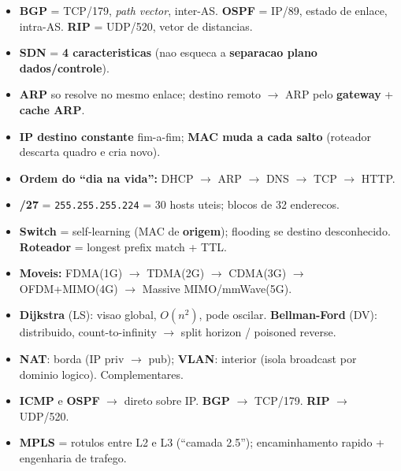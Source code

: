 \documentclass[11pt,a4paper]{article}
\begin{document}
\begin{colafinal}
\begin{itemize}[noitemsep, leftmargin=1.5em]
    \item \textbf{BGP} = TCP/179, \textit{path vector}, inter-AS. \quad \textbf{OSPF} = IP/89, estado de enlace, intra-AS. \quad \textbf{RIP} = UDP/520, vetor de distancias.
    \item \textbf{SDN} = \textbf{4 caracteristicas} (nao esqueca a \textbf{separacao plano dados/controle}).
    \item \textbf{ARP} so resolve no mesmo enlace; destino remoto $\to$ ARP pelo \textbf{gateway} + \textbf{cache ARP}.
    \item \textbf{IP destino constante} fim-a-fim; \textbf{MAC muda a cada salto} (roteador descarta quadro e cria novo).
    \item \textbf{Ordem do ``dia na vida'':} DHCP $\to$ ARP $\to$ DNS $\to$ TCP $\to$ HTTP.
    \item \textbf{/27} = \texttt{255.255.255.224} = 30 hosts uteis; blocos de 32 enderecos.
    \item \textbf{Switch} = self-learning (MAC de \textbf{origem}); flooding se destino desconhecido. \quad \textbf{Roteador} = longest prefix match + TTL.
    \item \textbf{Moveis:} FDMA(1G) $\to$ TDMA(2G) $\to$ CDMA(3G) $\to$ OFDM+MIMO(4G) $\to$ Massive MIMO/mmWave(5G).
    \item \textbf{Dijkstra} (LS): visao global, $O(n^2)$, pode oscilar. \quad \textbf{Bellman-Ford} (DV): distribuido, count-to-infinity $\to$ split horizon / poisoned reverse.
    \item \textbf{NAT}: borda (IP priv $\to$ pub); \textbf{VLAN}: interior (isola broadcast por dominio logico). Complementares.
    \item \textbf{ICMP} e \textbf{OSPF} $\to$ direto sobre IP. \quad \textbf{BGP} $\to$ TCP/179. \quad \textbf{RIP} $\to$ UDP/520.
    \item \textbf{MPLS} = rotulos entre L2 e L3 (``camada 2.5''); encaminhamento rapido + engenharia de trafego.
\end{itemize}
\end{colafinal}
\end{document}
